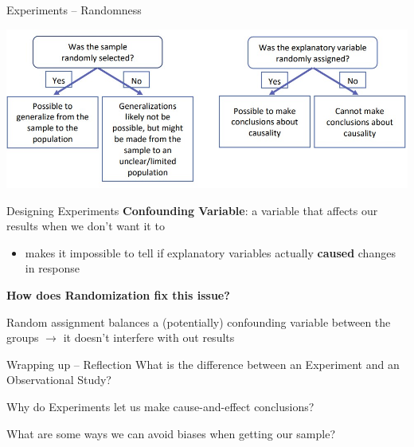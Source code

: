 \documentclass{beamer}
\begin{document}
\begin{frame}{Experiments -- Randomness}
\begin{center}
    \includegraphics[scale=.7]{img/experiments_conclusions.jpg}
\end{center}
\end{frame}



\begin{frame}{Designing Experiments}
\textbf{Confounding Variable}: a variable that affects our results when we don't want it to
\begin{itemize}
    \item makes it impossible to tell if explanatory variables actually \textbf{caused} changes in response
\end{itemize} \vspace{4mm}

\textbf{How does Randomization fix this issue?}

Random assignment balances a (potentially) confounding variable between the groups $\rightarrow$ it doesn't interfere with out results

\end{frame}



\begin{frame}{Wrapping up -- Reflection}
    What is the difference between an Experiment and an Observational Study? \vspace{4mm}

    Why do Experiments let us make cause-and-effect conclusions? \vspace{4mm}

    What are some ways we can avoid biases when getting our sample? \vspace{4mm}
\end{frame}
\end{document}
